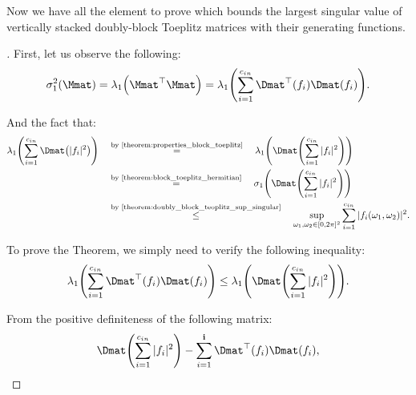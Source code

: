 Now we have all the element to prove  which bounds the largest singular value of vertically stacked doubly-block Toeplitz matrices with their generating functions. 

\begingroup
\addtolength{\jot}{1.5em}

\begin{proof}[]
First, let us observe the following:
\begin{equation}
    \sigma_1^2 \left( \Mmat \right) = \lambda_1 \left( \Mmat^{\top} \Mmat \right) = \lambda_1 \left( \sum_{i=1}^{\cin} \Dmat^{\top} \left(f_i \right) \Dmat (f_i) \right).
\end{equation}

And the fact that:
\begin{align}
    \lambda_1 \left( \sum_{i=1}^{\cin} \Dmat \left(|f_i|^2 \right) \right) \quad &\stackrel{\text{by \Cref{theorem:properties_block_toeplitz}}}{=} \quad \lambda_1 \left( \Dmat \left( \sum_{i=1}^{\cin} |f_i|^2 \right) \right) \\ 
    \quad &\stackrel{\text{by \Cref{theorem:block_toeplitz_hermitian}}}{=} \quad \sigma_1 \left( \Dmat \left( \sum_{i=1}^{\cin} |f_i|^2 \right) \right) \\
    \quad &\stackrel{\text{by \Cref{theorem:doubly_block_teoplitz_sup_singular}}}{\leq} \quad \sup_{\omega_1, \omega_2 \in [0, 2\pi]^2} \sum_{i=1}^{\cin} |f_i(\omega_1, \omega_2)|^2.
\end{align}

\noindent
To prove the Theorem, we simply need to verify the following inequality:
\begin{equation} \label{equation:eq2}
    \lambda_1 \left( \sum_{i=1}^{\cin} \Dmat^{\top} \left(f_i \right) \Dmat (f_i) \right) \leq \lambda_1 \left( \Dmat \left( \sum_{i=1}^{\cin} |f_i|^2 \right) \right). 
\end{equation}

\noindent
From the positive definiteness of the following matrix:
\begin{equation}
    \Dmat \left( \sum_{i=1}^{\cin} |f_i|^2 \right) - \sum_{i=1}^{\ci} \Dmat^{\top} \left(f_i \right) \Dmat (f_i),
\end{equation}


\end{proof}
